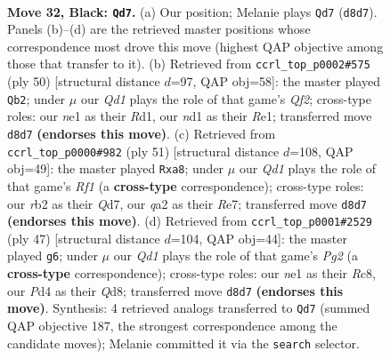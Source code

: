 \documentclass[11pt]{article}
\begin{document}
\clearpage

\begin{figure}[p]\centering
\begin{subfigure}{0.46\textwidth}\centering
\resizebox{\linewidth}{!}{%
\newchessgame
\chessboard[
  setfen={1rbq2k1/p1n1brn1/7p/P1p2p2/3p1Pp1/1P4P1/QRR1P1BP/2BNN1K1 b - - 3 32},
  showmover=false,
  pgfstyle=straightmove, color=movearrow, markmove={d8-d7}
]}
\caption{}
\end{subfigure}\hfill
\begin{subfigure}{0.46\textwidth}\centering
\resizebox{\linewidth}{!}{%
\newchessgame
\chessboard[
  setfen={1qr1rbk1/1b1n1pp1/pp1pp2p/8/P1PNP2P/1P2BPPB/5Q1K/3RR3 w - - 4 26},
  showmover=false,
  pgfstyle=straightmove, color=movearrow, markmove={f2-b2}
]}
\caption{}
\end{subfigure}
\\[4pt]
\begin{subfigure}{0.46\textwidth}\centering
\resizebox{\linewidth}{!}{%
\newchessgame
\chessboard[
  setfen={B4rk1/p1pqr1p1/1p1bpn1p/8/1P1P1P2/P2N2P1/1B2R2P/3QR1K1 b - - 0 26},
  showmover=false,
  pgfstyle=straightmove, color=movearrow, markmove={f8-a8}
]}
\caption{}
\end{subfigure}\hfill
\begin{subfigure}{0.46\textwidth}\centering
\resizebox{\linewidth}{!}{%
\newchessgame
\chessboard[
  setfen={2rq1bk1/r2n1ppp/p1b1p3/Pp6/2pPP1B1/2P3BP/2QN1PP1/R2R2K1 b - - 6 24},
  showmover=false,
  pgfstyle=straightmove, color=movearrow, markmove={g7-g6}
]}
\caption{}
\end{subfigure}
\caption{\textbf{Move 32, Black: \texttt{Qd7}.} (a) Our position; Melanie plays \texttt{Qd7} (\texttt{d8d7}). Panels (b)--(d) are the retrieved master positions whose correspondence most drove this move (highest QAP objective among those that transfer to it). (b) Retrieved from \texttt{ccrl\_top\_p0002\#575} (ply 50) [structural distance $d$=97, QAP obj=58]: the master played \texttt{Qb2}; under $\mu$ our \emph{Qd1} plays the role of that game's \emph{Qf2}; cross-type roles: our \emph{n}e1 as their \emph{R}d1, our \emph{n}d1 as their \emph{R}e1; transferred move \texttt{d8d7} \textbf{(endorses this move)}. (c) Retrieved from \texttt{ccrl\_top\_p0000\#982} (ply 51) [structural distance $d$=108, QAP obj=49]: the master played \texttt{Rxa8}; under $\mu$ our \emph{Qd1} plays the role of that game's \emph{Rf1} (a \textbf{cross-type} correspondence); cross-type roles: our \emph{r}b2 as their \emph{Q}d7, our \emph{q}a2 as their \emph{R}e7; transferred move \texttt{d8d7} \textbf{(endorses this move)}. (d) Retrieved from \texttt{ccrl\_top\_p0001\#2529} (ply 47) [structural distance $d$=104, QAP obj=44]: the master played \texttt{g6}; under $\mu$ our \emph{Qd1} plays the role of that game's \emph{Pg2} (a \textbf{cross-type} correspondence); cross-type roles: our \emph{n}e1 as their \emph{R}c8, our \emph{P}d4 as their \emph{Q}d8; transferred move \texttt{d8d7} \textbf{(endorses this move)}. Synthesis: 4 retrieved analogs transferred to \texttt{Qd7} (summed QAP objective 187, the strongest correspondence among the candidate moves); Melanie committed it via the \texttt{search} selector.}
\label{fig:thought-m63}
\end{figure}
\end{document}
